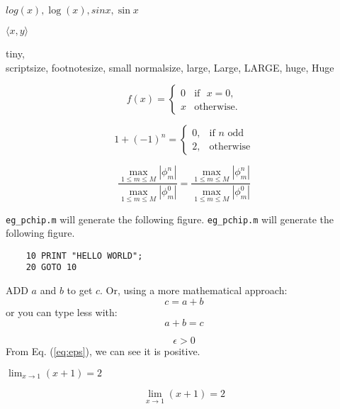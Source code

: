 \documentclass{article}
\begin{document}
$ log(x), \log(x), sin x, \sin x $

$ \langle x, y \rangle$

{\tiny tiny}, \\
{\scriptsize scriptsize},
{\footnotesize footnotesize}, {\small small}
{\normalsize normalsize}, {\large large}, {\Large Large},
{\LARGE LARGE}, {\huge huge}, {\Huge Huge}

\begin{equation}
f(x) = \begin{cases}
            0 & \text{if ~$x=0$,} \\
            x & \text{otherwise.} 
      \end{cases}
\end{equation}

\begin{equation}
1+(-1)^n=\begin{cases}
			0, & \text{if $n$ odd}\\
            2, & \text{otherwise}
		 \end{cases}
\end{equation}


\begin{equation}
    \frac{\max_{1 \leq m \leq M} | \phi^n_m|}
    {\max_{1 \leq m \leq M}|\phi^0_m|} =
    \frac{\displaystyle\max_{1\leq m \leq M} |\phi^n_m|}
    {\displaystyle\max_{1 \leq m \leq M}|\phi^0_m|}
\end{equation}

\verb+eg_pchip.m+ will generate the following figure.
\verb#eg_pchip.m# will generate the following figure.

\begin{verbatim}
    10 PRINT "HELLO WORLD";
    20 GOTO 10
\end{verbatim}

ADD $a$ and $b$ to get $c$.
Or, using a more mathematical approach:
\begin{displaymath}
c=a+b
\end{displaymath}
or you can type less with:
\[ a+b = c \]

\begin{equation}
    \epsilon > 0 \label{eq:eps}
\end{equation}
From Eq. (\ref{eq:eps}), we can see it is positive.

$ \lim_{x \to 1}(x+1) = 2$



\begin{displaymath}
\lim_{x \to 1}(x+1) = 2    
\end{displaymath}
\end{document}
